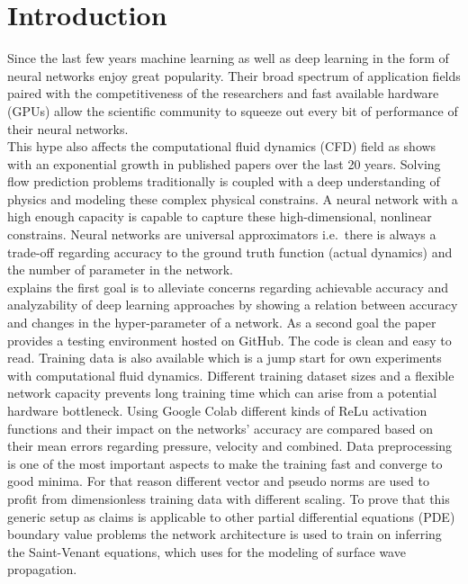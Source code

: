 \documentclass[acmtog]{techreportacmart}
\begin{document}
\section{Introduction}
Since the last few years machine learning as well as deep learning in the form 
of neural networks enjoy great popularity. Their broad spectrum of application 
fields paired with the competitiveness of the researchers and fast available hardware (GPUs) 
allow the scientific community to squeeze out every bit of performance of their 
neural networks. \\
This hype also affects the computational fluid dynamics (CFD) field as \cite{viquerat2019}
shows with an exponential growth in published papers over the last 20 years.
Solving flow prediction problems traditionally is coupled with a deep understanding 
of physics and modeling these complex physical constrains. A neural network with a 
high enough capacity is capable to capture these high-dimensional, nonlinear constrains.
Neural networks are universal approximators \cite{Approximation} i.e.\ there is always a
trade-off regarding accuracy to the ground truth function (actual dynamics) and the 
number of parameter in the network. \\
\cite{Thuerey20} explains the first goal is to alleviate concerns regarding achievable accuracy
and analyzability of deep learning approaches by showing a relation between accuracy and
changes in the  hyper-parameter of a network.
As a second goal the paper provides a testing environment hosted on GitHub. 
The code is clean and easy to read. Training data is also available which is 
a jump start for own experiments with computational fluid dynamics. Different training
dataset sizes and a flexible network capacity prevents long training time which can arise
from a potential hardware bottleneck. Using Google Colab different kinds of ReLu activation functions and their impact on the networks' accuracy are compared based on their mean errors regarding pressure, velocity and combined. Data preprocessing is one of the most important aspects to make the training fast and converge to good minima. For that reason different vector and pseudo norms are used to profit from dimensionless training data with different scaling. To prove that this generic setup as \cite{Thuerey20} claims is applicable to other partial differential equations (PDE) boundary value problems the network architecture is used to train on inferring the Saint-Venant equations, which \cite{Fotiadis2020} uses for the modeling of surface wave propagation.
\end{document}
